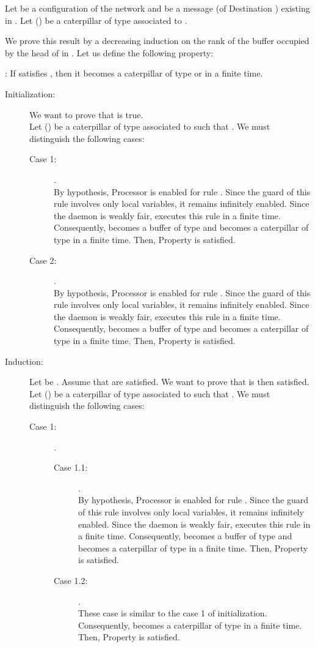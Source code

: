 \documentclass[11pt]{article}
\newenvironment{proof}{{\noindent\bf Proof. } }{{\hfill }}
\begin{document}
\begin{proof}
Let  be a configuration of the network and  be a message (of Destination ) existing in . Let  () be a caterpillar of type  associated to .

We prove this result by a decreasing induction on the rank of the buffer occupied by the head of  in . Let us define the following property:

 : If  satisfies , then it becomes a caterpillar of type  or  in a finite time.

\begin{description}
\item [Initialization:] We want to prove that  is true.\\
Let  () be a caterpillar of type  associated to  such that . We must distinguish the following cases:

\begin{description}
\item [Case 1:] .\\
By hypothesis, Processor  is enabled for rule . Since the guard of this rule involves only local variables, it remains infinitely enabled. Since the daemon is weakly fair,  executes this rule in a finite time. Consequently,  becomes a buffer of type  and  becomes a caterpillar of type  in a finite time. Then, Property  is satisfied.
\item [Case 2:] .\\
By hypothesis, Processor  is enabled for rule . Since the guard of this rule involves only local variables, it remains infinitely enabled. Since the daemon is weakly fair,  executes this rule in a finite time. Consequently,  becomes a buffer of type  and  becomes a caterpillar of type  in a finite time. Then, Property  is satisfied.
\end{description}

\item [Induction:] Let be . Assume that  are satisfied. We want to prove that  is then satisfied.\\
Let  () be a caterpillar of type  associated to  such that . We must distinguish the following cases:

\begin{description}
\item [Case 1:] .

\begin{description}
\item [Case 1.1:] .\\
By hypothesis, Processor  is enabled for rule . Since the guard of this rule involves only local variables, it remains infinitely enabled. Since the daemon is weakly fair,  executes this rule in a finite time. Consequently,  becomes a buffer of type  and  becomes a caterpillar of type  in a finite time. Then, Property  is satisfied.
\item [Case 1.2:] .\\
These case is similar to the case 1 of initialization. Consequently,  becomes a caterpillar of type  in a finite time. Then, Property  is satisfied.
\end{description}


\end{description}
\end{description}
\end{proof}
\end{document}

